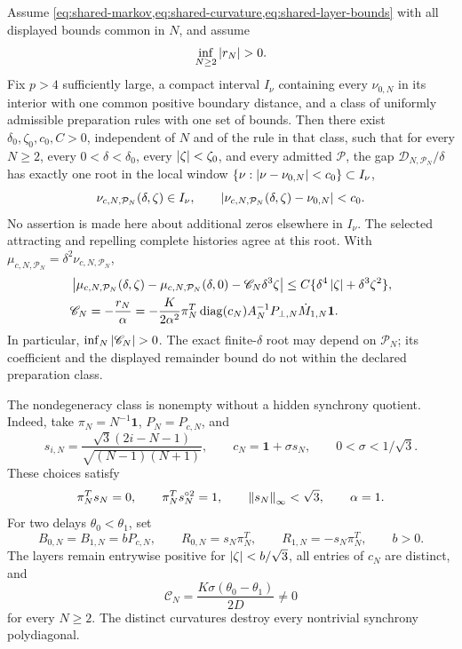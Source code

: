 \begin{theorem}\label{thm:shared-resource}
Assume \cref{eq:shared-markov,eq:shared-curvature,eq:shared-layer-bounds}
with all displayed bounds common in \(N\), and assume
\begin{equation}
 \inf_{N\ge2}\left\lvert r_N\right\rvert>0.                              \label{eq:shared-nondegeneracy}
\end{equation}
Fix \(p>4\) sufficiently large, a compact interval \(I_\nu\) containing
every \(\nu_{0,N}\) in its interior with one common positive boundary
distance, and a class of uniformly admissible preparation rules with one
set of bounds.  Then there exist
\(\delta_0,\zeta_0,c_0,C>0\), independent of \(N\) and of the rule in
that class, such that for every \(N\ge2\), every
\(0<\delta<\delta_0\), every \(\left\lvert\zeta\right\rvert<\zeta_0\), and every admitted
\(\mathcal P\), the gap \(\mathscr D_{N,\mathcal P_N}/\delta\) has exactly
one root in the local window
\(\{\nu:\left\lvert\nu-\nu_{0,N}\right\rvert<c_0\}\subset I_\nu\),
\begin{equation}
 \nu_{c,N,\mathcal P_N}(\delta,\zeta)\in I_\nu,
 \qquad
 \left\lvert\nu_{c,N,\mathcal P_N}(\delta,\zeta)-\nu_{0,N}\right\rvert<c_0. \label{eq:shared-root}
\end{equation}
No assertion is made here about additional zeros elsewhere in \(I_\nu\).
The selected attracting and repelling complete histories agree at this
root.  With
\(\mu_{c,N,\mathcal P_N}=\delta^2\nu_{c,N,\mathcal P_N}\),
\begin{align}
 &\left|\mu_{c,N,\mathcal P_N}(\delta,\zeta)
       -\mu_{c,N,\mathcal P_N}(\delta,0)
       -\mathscr C_N\delta^3\zeta\right|
 \le C\{\delta^4\left\lvert\zeta\right\rvert+\delta^3\zeta^2\},        \label{eq:shared-response}\\
 &\mathscr C_N=-\frac{r_N}{\alpha}
 =-\frac{K}{2\alpha^2}\pi_N^T\operatorname{diag}(c_N)
 A_N^{-1}P_{\perp,N}\dot M_{1,N}\mathbf1.             \label{eq:shared-coeff}
\end{align}
In particular,
\(\inf_N\left\lvert\mathscr C_N\right\rvert>0\).  The exact finite-\(\delta\) root may
depend on \(\mathcal P_N\); its coefficient and the displayed remainder
bound do not within the declared preparation class.
\end{theorem}

The nondegeneracy class is nonempty without a hidden synchrony quotient.
Indeed, take \(\pi_N=N^{-1}\mathbf1\), \(P_N=P_{c,N}\), and
\[
 s_{i,N}=\frac{\sqrt3(2i-N-1)}{\sqrt{(N-1)(N+1)}},
 \qquad c_N=\mathbf1+\sigma s_N,\qquad 0<\sigma<1/\sqrt3.
\]
These choices satisfy
\[
 \pi_N^Ts_N=0,\qquad \pi_N^Ts_N^{\circ2}=1,\qquad
 \left\lVert s_N\right\rVert_\infty<\sqrt3,\qquad \alpha=1.
\]
For two delays \(\theta_0<\theta_1\), set
\[
 B_{0,N}=B_{1,N}=bP_{c,N},\qquad
 R_{0,N}=s_N\pi_N^T,\qquad R_{1,N}=-s_N\pi_N^T,
 \qquad b>0.
\]
The layers remain entrywise positive for
\(\left\lvert\zeta\right\rvert<b/\sqrt3\), all entries of
\(c_N\) are distinct, and
\begin{equation}
 \mathscr C_N=\frac{K\sigma(\theta_0-\theta_1)}{2D}\ne0
                                                               \label{eq:shared-witness-coeff}
\end{equation}
for every \(N\ge2\).  The distinct curvatures destroy every nontrivial
synchrony polydiagonal.

